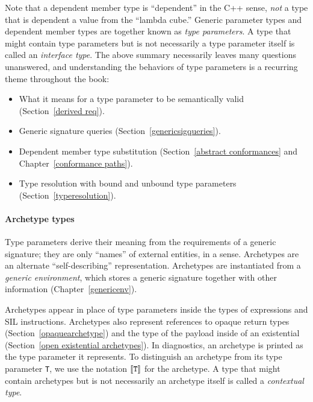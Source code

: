 \documentclass[../generics]{subfiles}
\begin{document}
Note that a dependent member type is ``dependent'' in the C++ sense, \emph{not} a type that is dependent a value from the ``lambda cube.'' Generic parameter types and dependent member types are together known as \emph{type parameters}. A type that might contain type parameters but is not necessarily a type parameter itself is called an \emph{interface type}. The above summary necessarily leaves many questions unanswered, and understanding the behaviors of type parameters is a recurring theme throughout the book:
\begin{itemize}
\item What it means for a type parameter to be semantically valid (Section~\ref{derived req}).
\item Generic signature queries (Section~\ref{genericsigqueries}).
\item Dependent member type substitution (Section~\ref{abstract conformances} and Chapter~\ref{conformance paths}).
\item Type resolution with bound and unbound type parameters (Section~\ref{typeresolution}).
\end{itemize}

\paragraph{Archetype types}
Type parameters derive their meaning from the requirements of a generic signature; they are only ``names'' of external entities, in a sense. Archetypes are an alternate ``self-describing'' representation. Archetypes are instantiated from a \emph{generic environment}, which stores a generic signature together with other information (Chapter~\ref{genericenv}).

Archetypes appear in place of type parameters inside the types of expressions and SIL instructions. Archetypes also represent references to opaque return types (Section~\ref{opaquearchetype}) and the type of the payload inside of an existential (Section~\ref{open existential archetypes}). In diagnostics, an archetype is printed as the type parameter it represents. To distinguish an archetype from its type parameter \texttt{T}, we use the notation $[\![\texttt{T}]\!]$ for the archetype. A type that might contain archetypes but is not necessarily an archetype itself is called a \emph{contextual type}.
\end{document}
